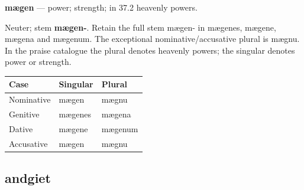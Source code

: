 \par\begin{minipage}{\linewidth}\raggedright
\textbf{mægen} — power; strength; in 37.2 heavenly powers.

Neuter; stem \textbf{mægen-}. Retain the full stem mægen- in mægenes, mægene, mægena and mægenum. The exceptional nominative/\allowbreak{}accusative plural is mægnu. In the praise catalogue the plural denotes heavenly powers; the singular denotes power or strength.

\par\begingroup
\fontsize{10.5}{13.2}\selectfont
\setlength{\LTleft}{0pt}\setlength{\LTright}{\fill}
\noindent
\begin{tabular}{@{}>{\raggedright\arraybackslash}p{39.46mm}>{\raggedright\arraybackslash}p{39.46mm}>{\raggedright\arraybackslash}p{39.46mm}@{}}
\toprule
\textbf{Case} & \textbf{Singular} & \textbf{Plural} \\
\midrule
Nominative & mægen & mægnu \\
Genitive & mægenes & mægena \\
Dative & mægene & mægenum \\
Accusative & mægen & mægnu \\
\bottomrule
\end{tabular}
\par\endgroup

\end{minipage}\par
{}
\subsection*{andgiet}

